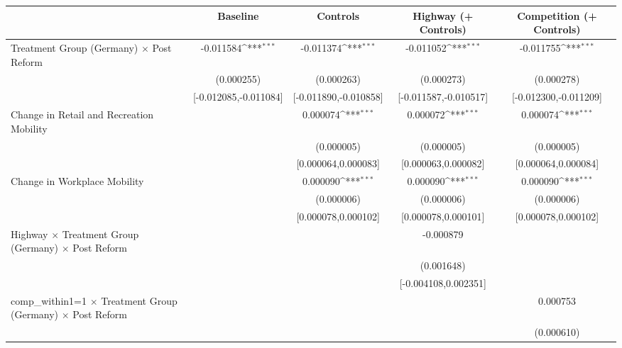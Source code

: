 {
\def\sym#1{\ifmmode^{#1}\else\(^{#1}\)\fi}
\begin{tabular}{l*{4}{c}}
\toprule
                    &\multicolumn{1}{c}{Baseline}&\multicolumn{1}{c}{Controls}&\multicolumn{1}{c}{Highway (+ Controls)}&\multicolumn{1}{c}{Competition (+ Controls)}\\
\midrule
Treatment Group (Germany) $\times$ Post Reform&   -0.011584\sym{***}&   -0.011374\sym{***}&   -0.011052\sym{***}&   -0.011755\sym{***}\\
                    &  (0.000255)         &  (0.000263)         &  (0.000273)         &  (0.000278)         \\
                    &[-0.012085,-0.011084]         &[-0.011890,-0.010858]         &[-0.011587,-0.010517]         &[-0.012300,-0.011209]         \\
Change in Retail and Recreation Mobility&                     &    0.000074\sym{***}&    0.000072\sym{***}&    0.000074\sym{***}\\
                    &                     &  (0.000005)         &  (0.000005)         &  (0.000005)         \\
                    &                     &[0.000064,0.000083]         &[0.000063,0.000082]         &[0.000064,0.000084]         \\
Change in Workplace Mobility&                     &    0.000090\sym{***}&    0.000090\sym{***}&    0.000090\sym{***}\\
                    &                     &  (0.000006)         &  (0.000006)         &  (0.000006)         \\
                    &                     &[0.000078,0.000102]         &[0.000078,0.000101]         &[0.000078,0.000102]         \\
Highway $\times$ Treatment Group (Germany) $\times$ Post Reform&                     &                     &   -0.000879         &                     \\
                    &                     &                     &  (0.001648)         &                     \\
                    &                     &                     &[-0.004108,0.002351]         &                     \\
comp\_within1=1 $\times$ Treatment Group (Germany) $\times$ Post Reform&                     &                     &                     &    0.000753         \\
                    &                     &                     &                     &  (0.000610)         \\

\end{tabular}}
